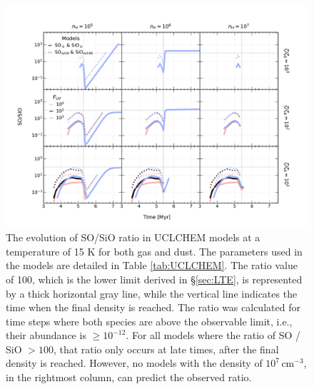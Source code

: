 \documentclass[]{aastex631}
\begin{document}
\begin{figure}[!ht]
    \centering
    \includegraphics[width=1.0\textwidth]{figures/UCLCHEM-SO-SIO_15K_1e-12.pdf}
    \caption{The evolution of SO/SiO ratio in UCLCHEM models at a temperature of 15 K for both gas and dust. The parameters used in the models are detailed in Table \ref{tab:UCLCHEM}. The ratio value of 100, which is the lower limit derived in \S \ref{sec:LTE}, is represented by a thick horizontal gray line, while the vertical line indicates the time when the final density is reached. The ratio was calculated for time steps where both species are above the observable limit, i.e., their abundance is $\geq 10^{-12}$. For all models where the ratio of SO / SiO $> 100$, that ratio only occurs at late times, after the final density is reached. However, no models with the density of $10^7\,\mathrm{cm}^{-3}$, in the rightmost column, can predict the observed ratio.}
    \label{fig:UCLCHEM-15}
\end{figure}
\end{document}
